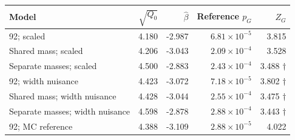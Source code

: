 \begin{tabular}{lrrrr}\toprule
Model & $\sqrt{Q_0}$ & $\widehat\beta$ & Reference $p_G$ & $Z_G$\\\midrule
92; scaled & 4.180 & -2.987 & $6.81\times10^{-5}$ & 3.815\\
Shared mass; scaled & 4.206 & -3.043 & $2.09\times10^{-4}$ & 3.528\\
Separate masses; scaled & 4.500 & -2.883 & $2.43\times10^{-4}$ & 3.488 $\dagger$\\
92; width nuisance & 4.423 & -3.072 & $7.18\times10^{-5}$ & 3.802 $\dagger$\\
Shared mass; width nuisance & 4.428 & -3.044 & $2.55\times10^{-4}$ & 3.475 $\dagger$\\
Separate masses; width nuisance & 4.598 & -2.878 & $2.88\times10^{-4}$ & 3.443 $\dagger$\\
92; MC reference & 4.388 & -3.109 & $2.88\times10^{-5}$ & 4.022\\
\bottomrule\end{tabular}
